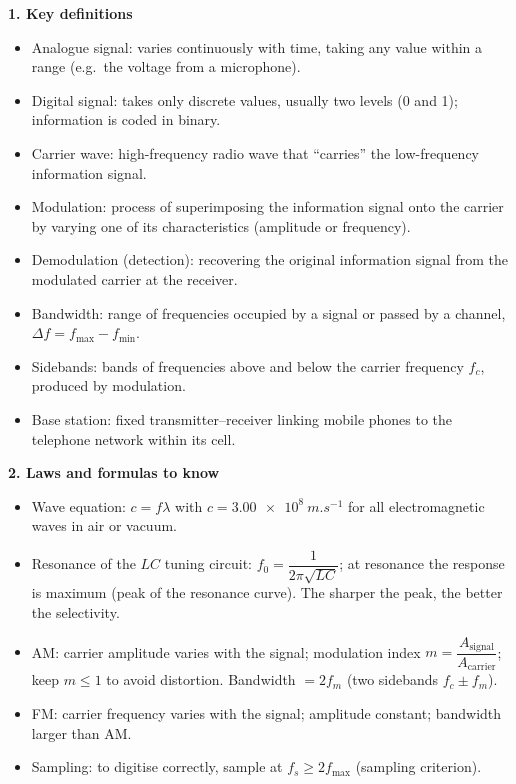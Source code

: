 \documentclass[11pt]{article}
\newcommand{\cle}[1]{{\popxbold\color{popdark}#1}}
\begin{document}
\begin{aretenir}
\textbf{1. Key definitions}
\begin{itemize}
  \item \cle{Analogue signal}: varies continuously with time, taking any value within a range (e.g.\ the voltage from a microphone).
  \item \cle{Digital signal}: takes only discrete values, usually two levels (0 and 1); information is coded in binary.
  \item \cle{Carrier wave}: high-frequency radio wave that ``carries'' the low-frequency information signal.
  \item \cle{Modulation}: process of superimposing the information signal onto the carrier by varying one of its characteristics (amplitude or frequency).
  \item \cle{Demodulation} (detection): recovering the original information signal from the modulated carrier at the receiver.
  \item \cle{Bandwidth}: range of frequencies occupied by a signal or passed by a channel, $\Delta f = f_{\max}-f_{\min}$.
  \item \cle{Sidebands}: bands of frequencies above and below the carrier frequency $f_c$, produced by modulation.
  \item \cle{Base station}: fixed transmitter--receiver linking mobile phones to the telephone network within its cell.
\end{itemize}

\textbf{2. Laws and formulas to know}
\begin{itemize}
  \item Wave equation: $c = f\lambda$ with $c = \SI{3.00e8}{m.s^{-1}}$ for all electromagnetic waves in air or vacuum.
  \item Resonance of the $LC$ tuning circuit: $f_0 = \dfrac{1}{2\pi\sqrt{LC}}$; at resonance the response is maximum (peak of the resonance curve). The sharper the peak, the better the \cle{selectivity}.
  \item AM: carrier amplitude varies with the signal; modulation index $m = \dfrac{A_{\text{signal}}}{A_{\text{carrier}}}$; keep $m \le 1$ to avoid distortion. Bandwidth $= 2f_m$ (two sidebands $f_c \pm f_m$).
  \item FM: carrier frequency varies with the signal; amplitude constant; bandwidth larger than AM.
  \item Sampling: to digitise correctly, sample at $f_s \ge 2f_{\max}$ (sampling criterion).
\end{itemize}


\end{aretenir}
\end{document}
